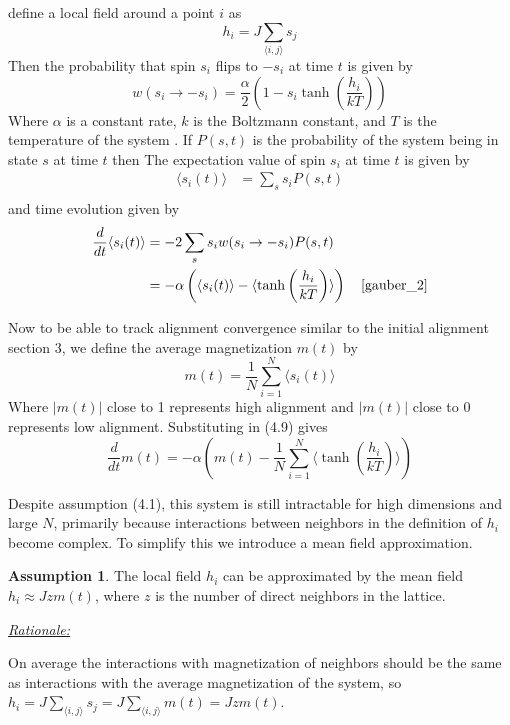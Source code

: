 \documentclass[11pt,a4paper]{article}
\numberwithin{equation}{section}
\theoremstyle{definition}
\theoremstyle{assumption}
\newtheorem{assumption}[theorem]{Assumption}
\newenvironment{rationale}{%
  \par\vspace{0.5em}
  \noindent\hspace{1em}\begin{minipage}{\dimexpr\linewidth-2em}
  \underline{\textit{Rationale:}} 
}{%
  \end{minipage}
  \par\vspace{0.5em}
}
\begin{document}
define a local field around a point $i$ as
\begin{equation}
    h_i = J \sum_{\langle i,j \rangle} s_j
\end{equation}
Then the probability that spin $s_i$ flips to $-s_i$ at time $t$ is given by 
\begin{equation}
    w(s_i \to -s_i) = \frac{\alpha}{2} \left( 1 - s_i \tanh\left( \frac{h_i}{kT} \right) \right)
\end{equation}
Where $\alpha$ is a constant rate, $k$ is the Boltzmann constant, and $T$ is the temperature of the system \cite{glauber}.
If $P(s, t)$ is the probability of the system being in state $s$ at time $t$ then
The expectation value of spin $s_i$ at time $t$ is given by
\begin{align}
    \langle s_i(t) \rangle &= \sum_{s} s_i P(s,t)\\
\end{align}
and time evolution given by 
\begin{align}
    \frac{d}{dt} \langle s_i(t) \rangle &= -2 \sum_{s} s_i w(s_i \to -s_i) P(s,t)\\
    &= -\alpha \left( \langle s_i(t) \rangle - \langle \tanh\left( \frac{h_i}{kT} \right) \rangle \right) \quad \text{\cite{gauber_2}}
\end{align}

Now to be able to track alignment convergence similar to the initial alignment section 3, we define
the average magnetization $m(t)$ by 
\begin{equation}
    m(t) = \frac{1}{N} \sum_{i=1}^N \langle s_i(t) \rangle
\end{equation}
Where $|m(t)|$ close to 1 represents high alignment and $|m(t)|$ close to 0 represents low alignment.
Substituting in (4.9) gives 
\begin{equation}
    \frac{d}{dt} m(t) = -\alpha \left( m(t) - \frac{1}{N} \sum_{i=1}^N \langle \tanh\left( \frac{h_i}{kT} \right) \rangle \right)
\end{equation}

Despite assumption (4.1), this system is still intractable for high dimensions and large $N$, 
primarily because interactions between neighbors in the definition of $h_i$ become complex. To simplify 
this we introduce a mean field approximation.
\begin{assumption}
    The local field $h_i$ can be approximated by the mean field $h_i \approx J z m(t)$, where $z$ is the number of direct neighbors in the lattice.
    \begin{rationale}
        On average the interactions with magnetization of neighbors should be the same
        as interactions with the average magnetization of the system, 
        so $h_i = J \sum_{\langle i,j \rangle} s_j = J \sum_{\langle i,j \rangle} m(t)= J z m(t)$.
    \end{rationale}
\end{assumption}
\end{document}
